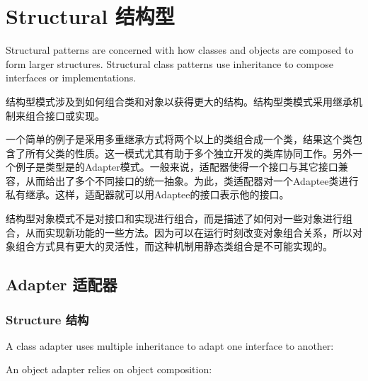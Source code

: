 \chapter{Structural 结构型}

Structural patterns are concerned with how classes and objects are composed to form larger structures. Structural class patterns use inheritance to compose interfaces or implementations.

结构型模式涉及到如何组合类和对象以获得更大的结构。结构型类模式采用继承机制来组合接口或实现。

一个简单的例子是采用多重继承方式将两个以上的类组合成一个类，结果这个类包含了所有父类的性质。这一模式尤其有助于多个独立开发的类库协同工作。另外一个例子是类型是的Adapter模式。一般来说，适配器使得一个接口与其它接口兼容，从而给出了多个不同接口的统一抽象。为此，类适配器对一个Adaptee类进行私有继承。这样，适配器就可以用Adaptee的接口表示他的接口。

结构型对象模式不是对接口和实现进行组合，而是描述了如何对一些对象进行组合，从而实现新功能的一些方法。因为可以在运行时刻改变对象组合关系，所以对象组合方式具有更大的灵活性，而这种机制用静态类组合是不可能实现的。


\section{Adapter 适配器}

\subsection{Structure 结构}

A class adapter uses multiple inheritance to adapt one interface to another:


An object adapter relies on object composition:



